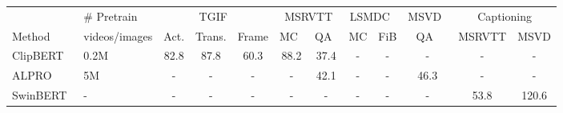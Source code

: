 \documentclass[10pt,twocolumn,letterpaper]{article}
\newlength\savewidth
\newcommand\shline{\noalign{\global\savewidth\arrayrulewidth\global\arrayrulewidth 1pt}\hline\noalign{\global\arrayrulewidth\savewidth}}
\newcommand{\tablestyle}[2]{\setlength{\tabcolsep}{#1}\renewcommand{\arraystretch}{#2}\centering\footnotesize}
\begin{document}
\begin{table*}[t]
\centering
    \tablestyle{7pt}{1.1} 
\begin{tabular}{ll|cccccccc|cc}
\shline
        ~ & \# Pretrain  & \multicolumn{3}{c}{TGIF~\cite{jang2017tgif-qa}}  & \multicolumn{2}{c}{MSRVTT\cite{xu2016msrvtt}}  & \multicolumn{2}{c}{LSMDC~\cite{torabi2016lsmdc-fib}}  & MSVD~\cite{chen2011msvd}  & \multicolumn{2}{c}{Captioning}\\
        \cmidrule(lr){3-5} \cmidrule(lr){6-7} \cmidrule(lr){8-9} \cmidrule(lr){10-10} \cmidrule(lr){11-12}
        Method & videos/images & Act. & Trans. & Frame  & MC~\cite{yu2018js-fusion} & QA~\cite{xu2017msrvtt-qa}  & MC & FiB  & QA~\cite{xu2017msrvtt-qa} & MSRVTT  & MSVD \\
        \shline
        ClipBERT~\cite{lei2021clip-bert} & 0.2M & 82.8 & 87.8 & 60.3  & 88.2 & 37.4  & - & -  & -  & -  & -\\
        ALPRO~\cite{li2022alpro} & 5M & - & - & - & - & 42.1 & - & - & 46.3 & - & - \\
        SwinBERT~\cite{lin2022swin-bert} & - & - & - & -  & - & -  & - & -  & -  & 53.8  & 120.6\\
        

\end{tabular}
\end{table*}
\end{document}
